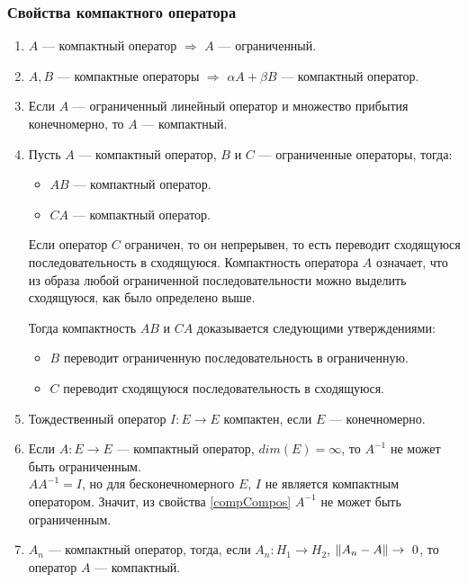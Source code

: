 \documentclass[12pt]{article}
\begin{document}
	\subsubsection{Свойства компактного оператора}
	\begin{enumerate}
		\item $A$ --- компактный оператор $\Rightarrow$ $A$ --- ограниченный.		
		\item $A, B$ --- компактные операторы $\Rightarrow$ $\alpha A + \beta B$ --- компактный оператор.		
		\item Если $A$ --- ограниченный линейный оператор и множество прибытия конечномерно, то $A$ --- компактный.		
		\item Пусть $A$ --- компактный оператор, $B$ и $C$ --- ограниченные операторы, тогда: \label{compCompos}
			\begin{itemize}
				\item $AB$ --- компактный оператор.
				\item $CA$ --- компактный оператор.
			\end{itemize}
		
			Если оператор $C$ ограничен, то он непрерывен, то есть переводит сходящуюся последовательность 
			в сходящуюся. Компактность оператора $A$ означает, что из образа любой ограниченной 
			последовательности можно выделить сходящуюся, как было определено выше.
		
			Тогда компактность $AB$ и $CA$ доказывается следующими утверждениями:
			\begin{itemize}
				\item $B$ переводит ограниченную последовательность в ограниченную.
				\item $C$ переводит сходящуюся последовательность в сходящуюся.
			\end{itemize}		
		\item Тождественный оператор $I:E\rightarrow E$ компактен, если $E$ --- конечномерно.
		\item Если $A:E \rightarrow E$ --- компактный оператор, $dim(E) = \infty$, то $A^{-1}$ не может быть ограниченным. \\

			$A A^{-1} = I$, но для бесконечномерного $E$, $I$ не является компактным оператором. Значит, 
			из свойства \ref{compCompos} $A^{-1}$ не может быть ограниченным.
		\item $A_n$ --- компактный оператор, тогда, если $A_n:H_1 \rightarrow H_2$, $\left\| A_n - A \right\| \rightarrow~0$, то 
		оператор $A$ --- компактный.
		

\end{enumerate}
\end{document}
